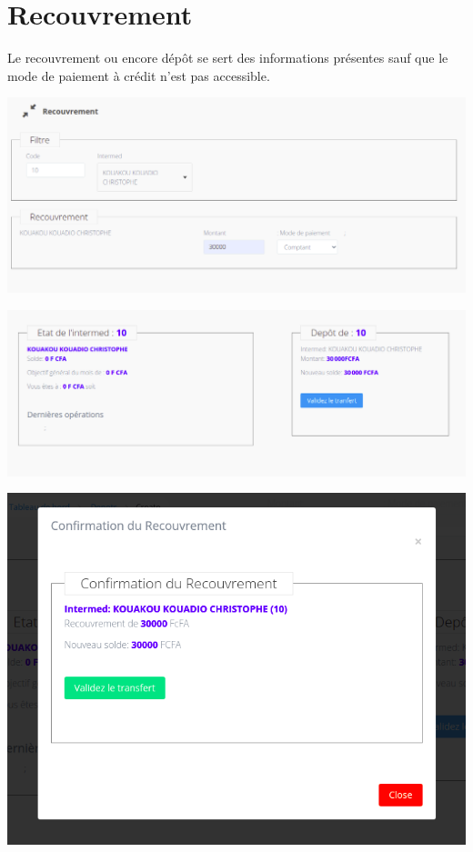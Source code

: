 	\section{Recouvrement}
		Le recouvrement ou encore dépôt se sert des informations présentes sauf que le mode de paiement à crédit n'est pas accessible.\\
		\begin{center}
			\includegraphics[scale=0.4]{chap_3/recouvrement_1.png}
			\label{recouvrement_1}
		\end{center}
		\begin{center}
			\includegraphics[scale=0.4]{chap_3/recouvrement_2.png}
			\label{recouvrement_2}
		\end{center}
		\begin{center}
			\includegraphics[scale=0.4]{chap_3/recouvrement_3.png}
			\label{recouvrement_3}
		\end{center}
